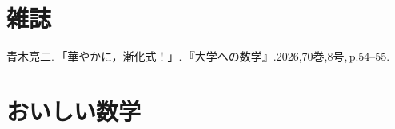   \section{雑誌}
  \begin{enumerate}[resume,label={[\arabic*]}]
    \item \begin{minipage}[t]{\linewidth}\raggedright
        青木亮二.\,「華やかに，漸化式！」.\,『大学への数学』.2026,70巻,8号,\,p.54--55.
      \end{minipage}\par\smallskip

  \end{enumerate}

  \section{おいしい数学}
